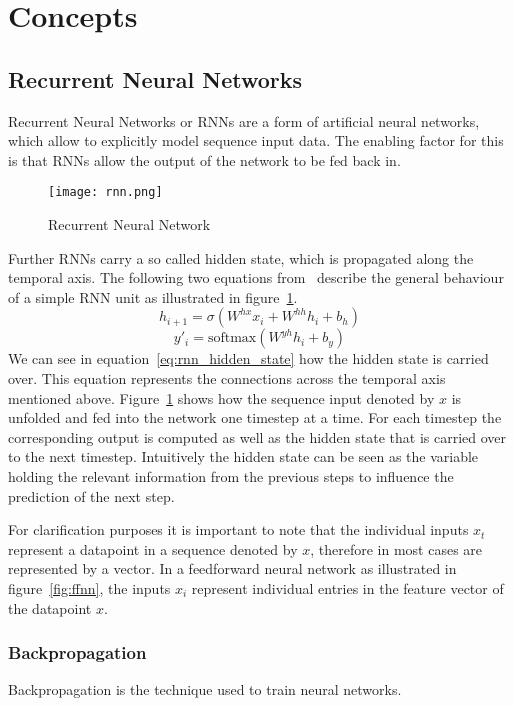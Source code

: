 \section{Concepts}
\subsection{Recurrent Neural Networks}\label{rnn}
Recurrent Neural Networks or RNNs are a form of artificial neural networks, which allow to explicitly model sequence input data.
The enabling factor for this is that RNNs allow the output of the network to be fed back in.

\begin{figure}[ht]
	\centering
	\captionsetup{width=0.8\textwidth}
    \texttt{[image: rnn.png]}
    \caption{Recurrent Neural Network}
    \label{fig:rnn}
\end{figure}

Further RNNs carry a so called hidden state, which is propagated along the temporal axis.
The following two equations from~\cite{rnn_survey} describe the general behaviour of a simple RNN unit as illustrated in figure~\ref{fig:rnn}.
\begin{equation}\label{eq:rnn_hidden_state}
    h_{i+1} = \sigma(W^{hx}x_i + W^{hh}h_i + b_h)
\end{equation}
\begin{equation}\label{eq:rnn_output}
    y'_i = \text{softmax}(W^{yh}h_i + b_y)
\end{equation}
We can see in equation~\ref{eq:rnn_hidden_state} how the hidden state is carried over.
This equation represents the connections across the temporal axis mentioned above.
Figure~\ref{fig:rnn} shows how the sequence input denoted by $x$ is unfolded and fed into the network one timestep at a time.
For each timestep the corresponding output is computed as well as the hidden state that is carried over to the next timestep.
Intuitively the hidden state can be seen as the variable holding the relevant information from the previous steps to influence the prediction of the next step.
\par
For clarification purposes it is important to note that the individual inputs $x_t$ represent a datapoint in a sequence denoted by $x$, therefore in most cases are represented by a vector.
In a feedforward neural network as illustrated in figure~\ref{fig:ffnn}, the inputs $x_i$ represent individual entries in the feature vector of the datapoint $x$.
\subsubsection{Backpropagation}
Backpropagation is the technique used to train neural networks.

